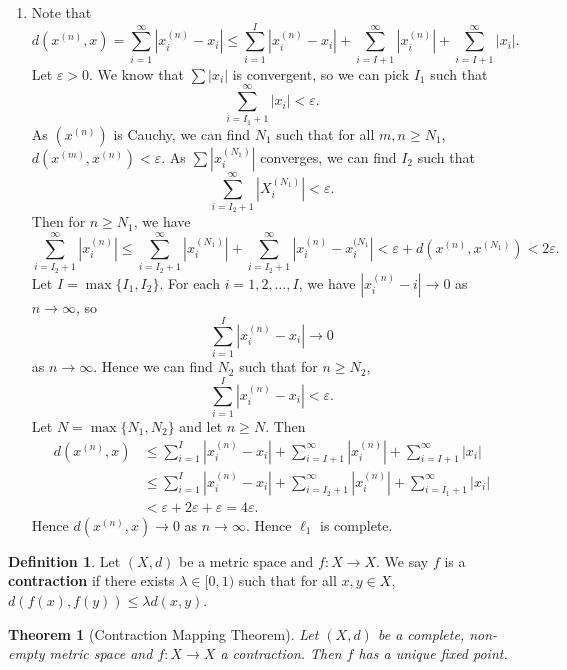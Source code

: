 \documentclass[12pt]{article}
\newtheorem{theorem}{Theorem}[section]
\theoremstyle{definition}
\newtheorem{definition}{Definition}[section]
\theoremstyle{remark}
\begin{document}
\begin{adjustbox}{minipage = \columnwidth - 25.5pt, margin=1em, frame=1pt, margin=0em}
\begin{enumerate}
	\item[]
		Note that
		\[
			d(x^{(n)}, x) = \sum_{i = 1}^{\infty} |x_i^{(n)} - x_i| \leq \sum_{i = 1}^{I} |x_i^{(n)} - x_i| + \sum_{i = I+1}^{\infty}|x_i^{(n)}| + \sum_{i = I+1}^{\infty}|x_i|
		.\]
		Let $\varepsilon > 0$. We know that $\sum |x_i|$ is convergent, so we can pick $I_1$ such that 
		\[
		\sum_{i = I_1 + 1}^{\infty}|x_i| < \varepsilon
		.\]
		As $(x^{(n)})$ is Cauchy, we can find $N_1$ such that for all $m, n \geq N_1$, $d(x^{(m)}, x^{(n)}) < \varepsilon$. As $\sum |x_i^{(N_1)}|$ converges, we can find $I_2$ such that
		\[
			\sum_{i = I_2 + 1}^{\infty} |X_i^{(N_1)}| < \varepsilon
		.\]
		Then for $n \geq N_1$, we have
		\[
			\sum_{i = I_2 + 1}^{\infty}|x_i^{(n)}| \leq \sum_{i = I_2 + 1}^{\infty}|x_i^{(N_1)}| + \sum_{i = I_2 + 1}^{\infty}|x_i^{(n)} - x_i^{(N_1}| < \varepsilon + d(x^{(n)}, x^{(N_1)}) < 2 \varepsilon
		.\]
		Let $I = \max\{I_1, I_2\}$. For each $i = 1, 2, \ldots, I$, we have $|x_i^{(n)} - i| \to 0$ as $n \to \infty$, so
		\[
			\sum_{i = 1}^{I}|x_i^{(n)} - x_i| \to 0
		\]
		as $n \to \infty$. Hence we can find $N_2$ such that for $n \geq N_2$,
		\[
			\sum_{i = 1}^{I}|x_i^{(n)} - x_i| < \varepsilon
		.\]
		Let $N = \max\{N_1, N_2\}$ and let $n \geq N$. Then
		\begin{align*}
			d(x^{(n)}, x) &\leq \sum_{i = 1}^{I}|x_i^{(n)} - x_i| + \sum_{i = I+1}^{\infty}|x_i^{(n)}| + \sum_{i = I+1}^{\infty}|x_i| \\
				      &\leq \sum_{i = 1}^{I}|x_i^{(n)} - x_i| + \sum_{i = I_2 + 1}^{\infty}|x_i^{(n)}| + \sum_{i = I_1 + 1}^{\infty}|x_i| \\
				      &< \varepsilon + 2\varepsilon + \varepsilon = 4\varepsilon.
		\end{align*}
		Hence $d(x^{(n)}, x) \to 0$ as $n \to \infty$. Hence $\ell_1$ is complete.
\end{enumerate}
\end{adjustbox}

\begin{definition}
	Let $(X, d)$ be a metric space and $f : X \to X$. We say $f$ is a \textbf{contraction} if there exists $\lambda \in [0, 1)$ such that for all $x,y \in X$, $d(f(x), f(y)) \leq \lambda d(x, y)$.
\end{definition}

\begin{theorem}[Contraction Mapping Theorem]
	Let $(X, d)$ be a complete, non-empty metric space and $f : X \to X$ a contraction. Then $f$ has a unique fixed point.
\end{theorem}
\end{document}
